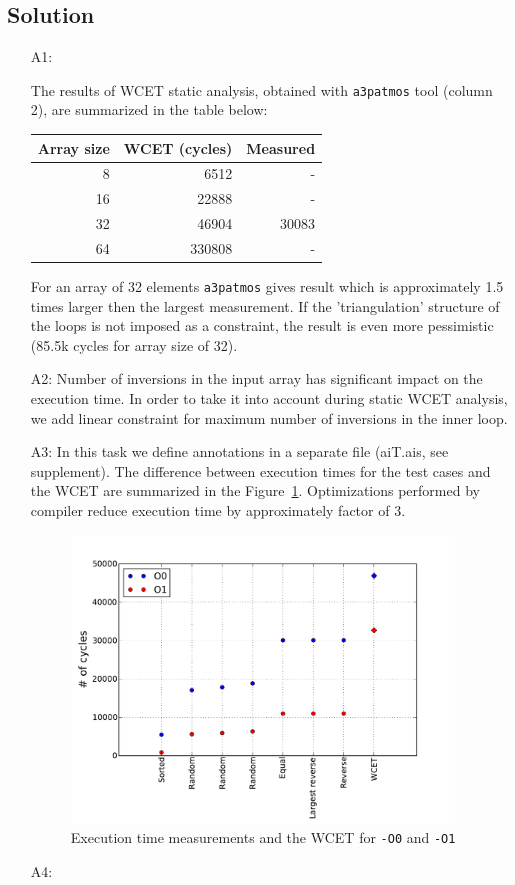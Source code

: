 \documentclass[12pt,a4paper,titlepage,oneside]{article}
\begin{document}
\subsection{Solution}

\begin{itemize}

\item[A1:]

The results of WCET static analysis, obtained with \texttt{a3patmos}
tool (column 2), are summarized in the table below:

\begin{tabular}{ | r | r | r |}
\hline
Array size & WCET (cycles) & Measured \\\hline
8  & 6512 & - \\\hline
16 & 22888 & - \\\hline
32 & 46904 & 30083 \\\hline
64 & 330808 & - \\\hline
\end{tabular}

For an array of 32 elements \texttt{a3patmos} gives result which is
approximately 1.5 times larger then the largest measurement. 
If the 'triangulation' structure of the loops is not
imposed as a constraint, the result is even more
pessimistic (85.5k cycles for array size of 32).

\item[A2:]
Number of inversions in the input array has significant impact on
the execution time. In order to take it into
account during static WCET analysis, we add linear
constraint for maximum number of inversions in the inner loop.

\item[A3:]
In this task we define annotations in a separate file (aiT.ais, see
supplement).
The difference between execution times for the test cases 
and the WCET are summarized in the Figure~\ref{fig:opt_compare}.
Optimizations performed by compiler  reduce execution
time by approximately factor of 3.

\begin{figure}[hb!]
  \centering
  \includegraphics[width=4in]{q2_3}
  \caption
  {Execution time measurements and the WCET for \texttt{-O0} and
  \texttt{-O1}}
	\label{fig:opt_compare}
\end{figure}


\item[A4:] 

\end{itemize}
\end{document}
